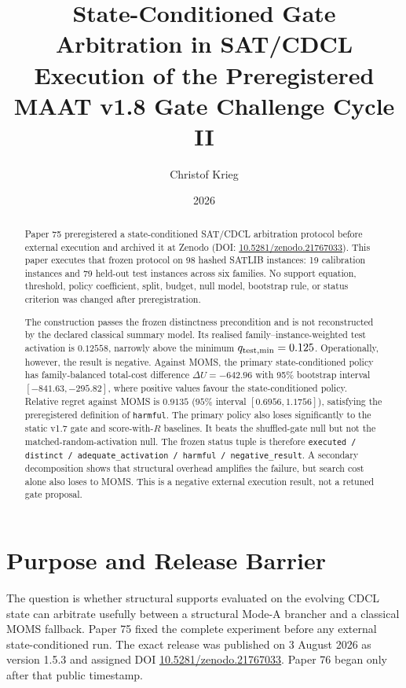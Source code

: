 \documentclass[11pt,a4paper]{article}
\title{State-Conditioned Gate Arbitration in SAT/CDCL\\
\large Execution of the Preregistered MAAT v1.8 Gate Challenge Cycle II}
\author{Christof Krieg}
\affil{MAAT Project, Independent Researcher\\
\href{https://maat-research.com}{maat-research.com}}
\date{2026}
\begin{document}
\maketitle

\begin{abstract}
Paper 75 preregistered a state-conditioned SAT/CDCL arbitration protocol before
external execution and archived it at Zenodo
(DOI: \href{https://doi.org/10.5281/zenodo.21767033}{10.5281/zenodo.21767033}).
This paper executes that frozen protocol on 98 hashed SATLIB instances: 19
calibration instances and 79 held-out test instances across six families.  No
support equation, threshold, policy coefficient, split, budget, null model,
bootstrap rule, or status criterion was changed after preregistration.

The construction passes the frozen distinctness precondition and is not
reconstructed by the declared classical summary model.  Its realised
family--instance-weighted test activation is $0.12558$, narrowly above the
minimum $q_{\rm test,min}=0.125$.  Operationally, however, the result is
negative.  Against MOMS, the primary state-conditioned policy has
family-balanced total-cost difference
$\Delta U=-642.96$ with 95\% bootstrap interval
$[-841.63,-295.82]$, where positive values favour the state-conditioned
policy.  Relative regret against MOMS is $0.9135$
($95\%$ interval $[0.6956,1.1756]$), satisfying the preregistered definition
of \texttt{harmful}.  The primary policy also loses significantly to the
static v1.7 gate and score-with-$R$ baselines.  It beats the shuffled-gate null
but not the matched-random-activation null.  The frozen status tuple is
therefore
\texttt{executed / distinct / adequate\_activation / harmful /
negative\_result}.  A secondary decomposition shows that structural overhead
amplifies the failure, but search cost alone also loses to MOMS.  This is a
negative external execution result, not a retuned gate proposal.
\end{abstract}

\section{Purpose and Release Barrier}

The question is whether structural supports evaluated on the evolving CDCL
state can arbitrate usefully between a structural Mode-A brancher and a
classical MOMS fallback.  Paper 75 fixed the complete experiment before any
external state-conditioned run.  The exact release was published on 3 August
2026 as version 1.5.3 and assigned DOI
\href{https://doi.org/10.5281/zenodo.21767033}{10.5281/zenodo.21767033}.
Paper 76 began only after that public timestamp.
\end{document}
